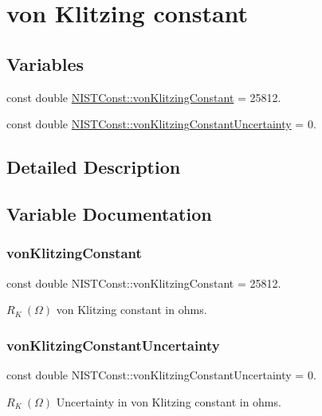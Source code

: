 \hypertarget{group__von_klitzing_constant}{}\section{von Klitzing constant}
\label{group__von_klitzing_constant}
\subsection*{Variables}
\begin{DoxyCompactItemize}
\item 
const double \hyperlink{group__von_klitzing_constant_ga664441cab64a6a8feda702f6354c1e7f}{N\+I\+S\+T\+Const\+::von\+Klitzing\+Constant} = 25812.
\item 
const double \hyperlink{group__von_klitzing_constant_ga8fa7b05f4ab4958f9bed81f592304e49}{N\+I\+S\+T\+Const\+::von\+Klitzing\+Constant\+Uncertainty} = 0.
\end{DoxyCompactItemize}


\subsection{Detailed Description}


\subsection{Variable Documentation}
\mbox{\label{group__von_klitzing_constant_ga664441cab64a6a8feda702f6354c1e7f}} 
\subsubsection{\texorpdfstring{von\+Klitzing\+Constant}{vonKlitzingConstant}}
{\footnotesize\ttfamily const double N\+I\+S\+T\+Const\+::von\+Klitzing\+Constant = 25812.}

$R_K \ (\Omega)$ von Klitzing constant in ohms. \mbox{\label{group__von_klitzing_constant_ga8fa7b05f4ab4958f9bed81f592304e49}} 
\subsubsection{\texorpdfstring{von\+Klitzing\+Constant\+Uncertainty}{vonKlitzingConstantUncertainty}}
{\footnotesize\ttfamily const double N\+I\+S\+T\+Const\+::von\+Klitzing\+Constant\+Uncertainty = 0.}

$R_K \ (\Omega)$ Uncertainty in von Klitzing constant in ohms. 